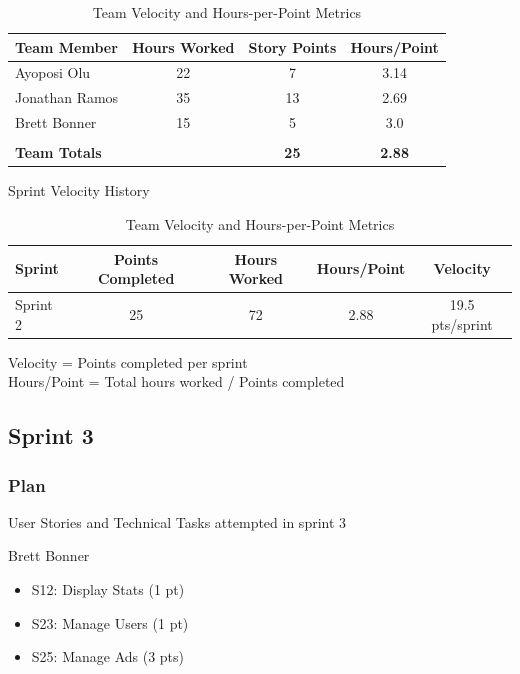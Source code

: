 \begin{table}[h]
\centering
\caption{Team Velocity and Hours-per-Point Metrics}
\begin{tabular}{|l|c|c|c|}
\hline
\textbf{Team Member} & \textbf{Hours Worked} & \textbf{Story Points} & \textbf{Hours/Point} \\
\hline
Ayoposi Olu & 22 & 7 & 3.14 \\
\hline
Jonathan Ramos & 35 & 13 & 2.69 \\
\hline
Brett Bonner & 15 & 5 & 3.0 \\
\hline
\multicolumn{4}{|c|}{} \\
\hline
\multicolumn{2}{|l|}{\textbf{Team Totals }} & \textbf{25} & \textbf{2.88} \\
\hline
\end{tabular}

\begin{center}
\small{Sprint Velocity History}
\end{center}
\begin{tabular}{|l|c|c|c|c|}
\hline
\textbf{Sprint} & \textbf{Points Completed} & \textbf{Hours Worked} & \textbf{Hours/Point} & \textbf{Velocity} \\
\hline
Sprint 2 & 25 & 72 & 2.88 & 19.5 pts/sprint \\
\hline
\end{tabular}

\vspace{0.5cm}
\begin{center}
\small{Velocity = Points completed per sprint \\
Hours/Point = Total hours worked / Points completed}
\end{center}
\end{table}


\subsection{Sprint 3}

\subsubsection{Plan}
User Stories and Technical Tasks attempted in sprint 3

Brett Bonner
\begin{itemize}
    \item S12: Display Stats (1 pt)
    \item S23: Manage Users (1 pt)
    \item S25: Manage Ads (3 pts)
\end{itemize}


